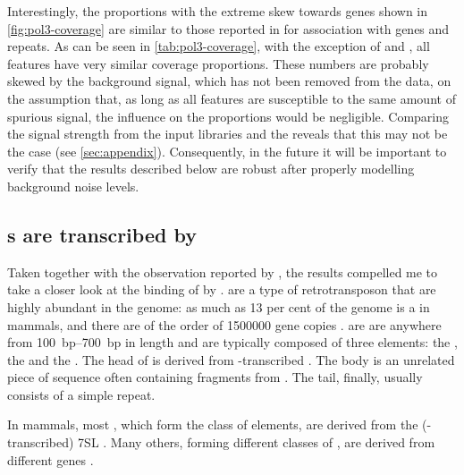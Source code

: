 Interestingly, the proportions with the extreme skew towards \trna genes shown
in \cref{fig:pol3-coverage} are similar to those reported in
\citet{Raha:2010,Canella:2012} for  association with  genes and
repeats. As can be seen in \cref{tab:pol3-coverage}, with the exception of \rrna
and \transline[s], all features have very similar coverage proportions. These
numbers are probably skewed by the  \chipseq background signal, which has
not been removed from the data, on the assumption that, as long as all features
are susceptible to the same amount of spurious signal, the influence on the
proportions would be negligible. Comparing the signal strength from the input
libraries and the  \chip reveals that this may not be the case (see
\cref{sec:appendix}). Consequently, in the future it will be important to verify
that the results described below are robust after properly modelling background
noise levels.

\subsection{s are transcribed by }

Taken together with the observation reported by \citet{Carriere:2012}, the
results compelled me to take a closer look at the binding of \transsine[s] by
. \transsine[s] are a type of retrotransposon that are highly abundant in
the genome: as much as \num{13} per cent of the genome is a \transsine in
mammals, and there are of the order of \num{1500000} gene copies
\citep{Lander:2001}. \transsine[s] are are anywhere from \SIrange{100}{700}{bp}
in length and are typically composed of three elements: the , the
 and the . The head of \transsine[s] is derived from
-transcribed \rna[s]. The body is an unrelated piece of sequence often
containing fragments from \transline[s]. The tail, finally, usually consists of
a simple repeat.

In mammals, most \transsine[s], which form the class of  elements,
are derived from the (-transcribed) 7SL \ncrna. Many others, forming
different classes of \transsine[s], are derived from different \trna genes
\citep{Vassetzky:2013}.

